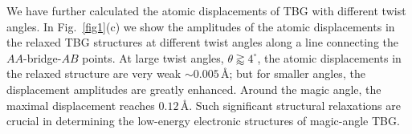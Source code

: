\documentclass[aps,prl,twocolumn,amsmath,amssymb]{revtex4-2}
\def\Red#1{\textcolor{red}{#1}}
\def\angstrom{\mbox{\normalfont\AA}}
\begin{document}


We have further calculated the atomic displacements of TBG with different twist angles. In Fig.~\ref{fig1}(c) we show the amplitudes of the atomic displacements in the relaxed TBG structures at different twist angles along a line  connecting the $AA$-bridge-$AB$ points. At large twist angles, $\theta\gtrapprox 4^{\circ}$, the atomic displacements in the relaxed structure are very weak $\sim0.005\,$\angstrom; but for smaller angles, the displacement amplitudes are greatly enhanced. Around the magic angle, the maximal displacement reaches $0.12\,$\angstrom.  Such significant structural relaxations are crucial in determining the low-energy electronic structures of magic-angle TBG.   %
\end{document}

